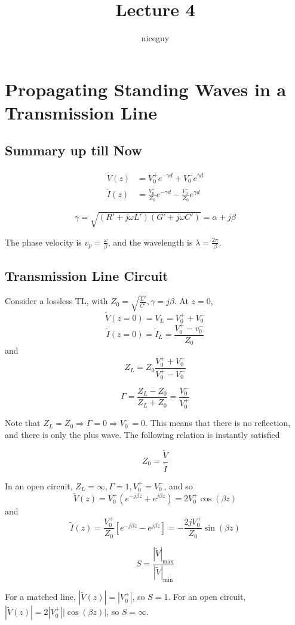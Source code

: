 \documentclass[12pt]{article}
\title{Lecture 4}
\author{niceguy}
\begin{document}
\maketitle

\section{Propagating Standing Waves in a Transmission Line}

\subsection{Summary up till Now}

\begin{align*}
    \tilde V(z) &= V_0^+ e^{-\gamma d} + V_0^-e^{\gamma d} \\
    \tilde I(z) &= \frac{V_0^+}{Z_0} e^{-\gamma d} - \frac{V_0^-}{Z_0} e^{\gamma d}
\end{align*}

$$\gamma = \sqrt{(R'+j\omega L')(G'+j\omega C')} = \alpha + j\beta$$

The phase velocity is $v_p = \frac{\omega}{\beta}$, and the wavelength is $\lambda = \frac{2\pi}{\beta}$.

\subsection{Transmission Line Circuit}

Consider a lossless TL, with $Z_0 = \sqrt{\frac{L'}{C'}}, \gamma = j\beta$. At $z = 0$,
$$\tilde V(z=0) = V_L = V_0^+ + V_0^-$$
$$\tilde I(z=0) = \tilde I_L = \frac{V_0^+ - v_0^-}{Z_0}$$
and
$$Z_L = Z_0 \frac{V_0^+ + V_0^-}{V_0^+ - V_0^-}$$

\begin{defn}
    $$\Gamma = \frac{Z_L - Z_0}{Z_L + Z_0} = \frac{V_0^-}{V_0^+}$$
\end{defn}

Note that $Z_L = Z_0 \Rightarrow \Gamma = 0 \Rightarrow V_0^- = 0$. This means that there is no reflection, and there is only the plus wave. The following relation is instantly satisfied

$$Z_0 = \frac{\tilde V}{\tilde I}$$

In an open circuit, $Z_L = \infty, \Gamma = 1, V_0^+ = V_0^-$, and so
$$\tilde V(z) = V_0^+(e^{-j\beta z} + e^{j\beta z}) = 2V_0^+\cos(\beta z)$$
and
$$\tilde I(z) = \frac{V_0^+}{Z_0}[e^{-j\beta z} - e^{j\beta z}] = -\frac{2jV_0^+}{Z_0} \sin(\beta z)$$

\begin{defn}
    $$S = \frac{|\tilde V|_{\text{max}}}{|\tilde V|_{\text{min}}}$$
\end{defn}

For a matched line, $|\tilde V(z)| = |V_0^+|$, so $S = 1$. For an open circuit, $|\tilde V(z)| = 2|V_0^+||\cos(\beta z)|$, so $S = \infty$.
\end{document}
